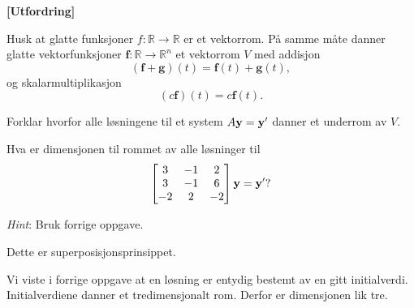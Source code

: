 \newpage
\begin{oppgave}\textbf{[Utfordring]}
	
\noindent
Husk at glatte funksjoner $f :\mathbb{R}\rightarrow \mathbb{R}$ er et vektorrom. På samme måte danner glatte vektorfunksjoner $\mathbf f:\mathbb{R}\rightarrow \mathbb{R}^n$ et vektorrom $V$ med addisjon
$$(\mathbf f + \mathbf g)(t)=\mathbf{f}(t)+\mathbf{g}(t),$$ og skalarmultiplikasjon
$$(c \mathbf f )(t)=c\mathbf{f}(t).$$

\begin{punkt}
Forklar hvorfor alle løsningene til et system $A\mathbf{y}=\mathbf{y}'$ danner et underrom av $V$.
\end{punkt}

\begin{punkt}
Hva er dimensjonen til rommet av alle løsninger til $$
\begin{bmatrix}
3 & -1 & 2\\
3 & -1 & 6\\
-2 & 2 & -2
\end{bmatrix} \mathbf{y}= \mathbf{y} ' ?$$

\noindent
\emph{Hint}: Bruk forrige oppgave.
\end{punkt}


\end{oppgave}





\begin{losning}
	\begin{punkt}
		Dette er superposisjonsprinsippet.
	\end{punkt}
	
	\begin{punkt}
	Vi viste i forrige oppgave at en løsning er entydig bestemt av en gitt initialverdi. Initialverdiene danner et tredimensjonalt rom. Derfor er dimensjonen lik tre.
	\end{punkt}
	
	
\end{losning}
